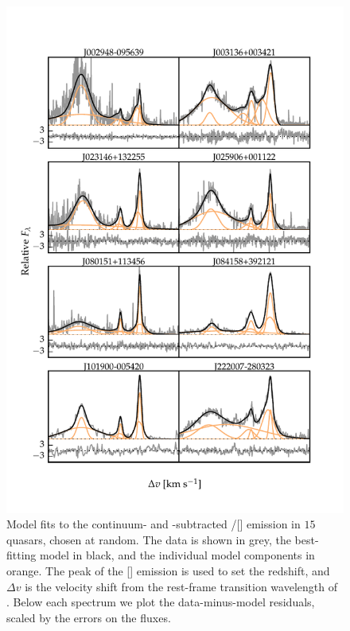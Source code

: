 \begin{figure}
    \centering
    \includegraphics[width=\textwidth]{figures/chapter04/example_spectrum_grid.pdf} 
    \caption[{Model fits to the continuum- and -subtracted \hbns/[] emission in eight quasars, chosen at random.}]{Model fits to the continuum- and -subtracted \hbns/[] emission in $15$ quasars, chosen at random. The data is shown in grey, the best-fitting model in black, and the individual model components in orange. The peak of the [] emission is used to set the redshift, and $\Delta{v}$ is the velocity shift from the rest-frame transition wavelength of \hbns. Below each spectrum we plot the data-minus-model residuals, scaled by the errors on the fluxes.}     
    \label{fig:example_spectrum_grid}
\end{figure}

